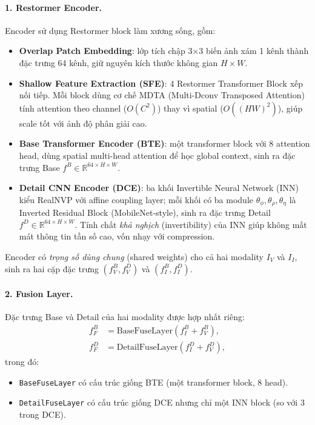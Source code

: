 \paragraph{1. Restormer Encoder.}
Encoder sử dụng Restormer block \cite{zamir2022restormer} làm xương sống, gồm:
\begin{itemize}\itemsep0pt
    \item \textbf{Overlap Patch Embedding}: lớp tích chập 3$\times$3 biến ảnh xám 1 kênh thành đặc trưng 64 kênh, giữ nguyên kích thước không gian $H \times W$.
    \item \textbf{Shallow Feature Extraction (SFE)}: 4 Restormer Transformer Block xếp nối tiếp. Mỗi block dùng cơ chế MDTA (Multi-Dconv Transposed Attention) tính attention theo channel ($O(C^2)$) thay vì spatial ($O((HW)^2)$), giúp scale tốt với ảnh độ phân giải cao.
    \item \textbf{Base Transformer Encoder (BTE)}: một transformer block với 8 attention head, dùng spatial multi-head attention để học global context, sinh ra đặc trưng Base $f^B \in \mathbb{R}^{64 \times H \times W}$.
    \item \textbf{Detail CNN Encoder (DCE)}: ba khối Invertible Neural Network (INN) kiểu RealNVP với affine coupling layer; mỗi khối có ba module $\theta_{\phi}, \theta_{\rho}, \theta_{\eta}$ là Inverted Residual Block (MobileNet-style), sinh ra đặc trưng Detail $f^D \in \mathbb{R}^{64 \times H \times W}$. Tính chất \emph{khả nghịch} (invertibility) của INN giúp không mất mát thông tin tần số cao, vốn nhạy với compression.
\end{itemize}
Encoder có \emph{trọng số dùng chung} (shared weights) cho cả hai modality $I_V$ và $I_I$, sinh ra hai cặp đặc trưng $(f_V^B, f_V^D)$ và $(f_I^B, f_I^D)$.

\paragraph{2. Fusion Layer.}
Đặc trưng Base và Detail của hai modality được hợp nhất riêng:
\begin{align}
f_F^B &= \mathrm{BaseFuseLayer}(f_I^B + f_V^B), \label{eq:fuse-base} \\
f_F^D &= \mathrm{DetailFuseLayer}(f_I^D + f_V^D), \label{eq:fuse-detail}
\end{align}
trong đó:
\begin{itemize}\itemsep0pt
    \item \texttt{BaseFuseLayer} có cấu trúc giống BTE (một transformer block, 8 head).
    \item \texttt{DetailFuseLayer} có cấu trúc giống DCE nhưng chỉ một INN block (so với 3 trong DCE).
\end{itemize}

